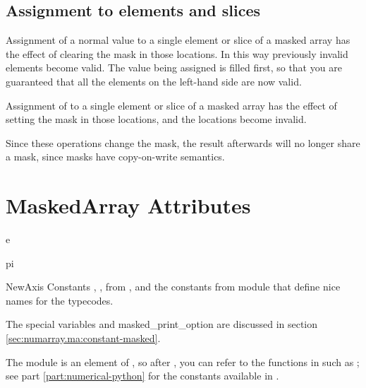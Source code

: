 \subsection{Assignment to elements and slices}
\label{sec:numarray.ma:assignments-elements-slices}

Assignment of a normal value to a single element or slice of a masked array has
the effect of clearing the mask in those locations. In this way previously
invalid elements become
valid. The value being assigned is filled first, so
that you are guaranteed that all the elements on the left-hand side are now
valid.  

Assignment of  to a single element or slice of a masked array
has the effect of setting the mask in those locations, and the locations become
invalid.

Since these operations change the mask, the result afterwards will no longer
share a mask, since masks have copy-on-write semantics.



\section{MaskedArray Attributes}
\label{sec:numarray.ma:attributes}

\begin{datadesc}{e}
\end{datadesc}
\begin{datadesc}{pi}
\end{datadesc}
\begin{datadesc}{NewAxis}
   Constants , ,  from
   \module{\numarray}, and the constants from module  that
   define nice names for the typecodes.
\end{datadesc}

The special variables  and
masked_print_option are discussed in section
\ref{sec:numarray.ma:constant-masked}.

The module \module{\numarray} is an element of , so after , you can refer to the functions in \module{\numarray} such as
; see part \ref{part:numerical-python} for the
constants available in \module{\numarray}.




